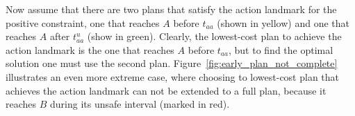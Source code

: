 \documentclass[letterpaper]{article} %
\newcommand{\ccbs}{\ac{CCBS}\xspace}
\begin{document}
Now assume that there are two plans that satisfy the action landmark for the positive constraint, one that reaches $A$ before $t_{aa}$ (shown in yellow) and one that reaches $A$ after $t_{aa}^u$ (show in green). 
Clearly, the lowest-cost plan to achieve the action landmark is the one that reaches $A$ before $t_{aa}$, but to find the optimal solution one must use the second plan. 
Figure~\ref{fig:early_plan_not_complete} illustrates an even more extreme case, where choosing to lowest-cost plan that achieves the action landmark can not be extended to a full plan, because it reaches $B$ during its unsafe interval (marked in red). 





\end{document}
